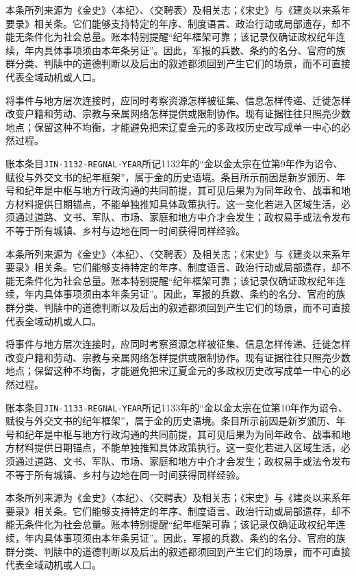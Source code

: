 本条所列来源为《金史》〈本纪〉、〈交聘表〉及相关志；《宋史》与《建炎以来系年要录》相关条。它们能够支持特定的年序、制度语言、政治行动或局部遗存，却不能无条件化为社会总量。账本特别提醒“纪年框架可靠；该记录仅确证政权纪年连续，年内具体事项须由本年条另证”。因此，军报的兵数、条约的名分、官府的族群分类、判牍中的道德判断以及后出的叙述都须回到产生它们的场景，而不可直接代表全域动机或人口。

将事件与地方层次连接时，应同时考察资源怎样被征集、信息怎样传递、迁徙怎样改变户籍和劳动、宗教与亲属网络怎样提供或限制协作。现有证据往往只照亮少数地点；保留这种不均衡，才能避免把宋辽夏金元的多政权历史改写成单一中心的必然过程。

账本条目\texttt{JIN-1132-REGNAL-YEAR}所记1132年的“金以金太宗在位第9年作为诏令、赋役与外交文书的纪年框架”，属于金的历史语境。条目所示前因是新岁颁历、年号和纪年是中枢与地方行政沟通的共同前提，其可见后果为为同年政令、战事和地方材料提供日期锚点，不能单独推知具体政策执行。这一变化若进入区域生活，必须通过道路、文书、军队、市场、家庭和地方中介才会发生；政权易手或法令发布不等于所有城镇、乡村与边地在同一时间获得同样经验。

本条所列来源为《金史》〈本纪〉、〈交聘表〉及相关志；《宋史》与《建炎以来系年要录》相关条。它们能够支持特定的年序、制度语言、政治行动或局部遗存，却不能无条件化为社会总量。账本特别提醒“纪年框架可靠；该记录仅确证政权纪年连续，年内具体事项须由本年条另证”。因此，军报的兵数、条约的名分、官府的族群分类、判牍中的道德判断以及后出的叙述都须回到产生它们的场景，而不可直接代表全域动机或人口。

将事件与地方层次连接时，应同时考察资源怎样被征集、信息怎样传递、迁徙怎样改变户籍和劳动、宗教与亲属网络怎样提供或限制协作。现有证据往往只照亮少数地点；保留这种不均衡，才能避免把宋辽夏金元的多政权历史改写成单一中心的必然过程。

账本条目\texttt{JIN-1133-REGNAL-YEAR}所记1133年的“金以金太宗在位第10年作为诏令、赋役与外交文书的纪年框架”，属于金的历史语境。条目所示前因是新岁颁历、年号和纪年是中枢与地方行政沟通的共同前提，其可见后果为为同年政令、战事和地方材料提供日期锚点，不能单独推知具体政策执行。这一变化若进入区域生活，必须通过道路、文书、军队、市场、家庭和地方中介才会发生；政权易手或法令发布不等于所有城镇、乡村与边地在同一时间获得同样经验。

本条所列来源为《金史》〈本纪〉、〈交聘表〉及相关志；《宋史》与《建炎以来系年要录》相关条。它们能够支持特定的年序、制度语言、政治行动或局部遗存，却不能无条件化为社会总量。账本特别提醒“纪年框架可靠；该记录仅确证政权纪年连续，年内具体事项须由本年条另证”。因此，军报的兵数、条约的名分、官府的族群分类、判牍中的道德判断以及后出的叙述都须回到产生它们的场景，而不可直接代表全域动机或人口。

